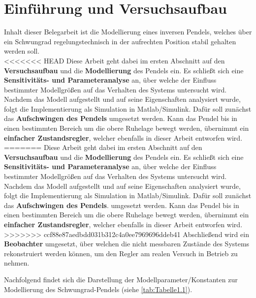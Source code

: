 \pagestyle{aaron}
\section{Einführung und Versuchsaufbau}\label{sec:Einfuehrung}

Inhalt dieser Belegarbeit ist die Modellierung eines inversen Pendels, welches über ein Schwungrad regelungstechnisch in der aufrechten Position stabil gehalten werden soll. \\

<<<<<<< HEAD
Diese Arbeit geht dabei im ersten Abschnitt auf den \textbf{Versuchsaufbau} und die \textbf{Modellierung} des Pendels ein. Es schließt sich eine \textbf{Sensitivitäts- und Parameteranalyse} an, über welche der Einfluss bestimmter Modellgrößen auf das Verhalten des Systems untersucht wird. \\
Nachdem das Modell aufgestellt und auf seine Eigenschaften analysiert wurde, folgt die Implementierung als Simulation in Matlab/Simulink. Dafür soll zunächst das \textbf{Aufschwingen des Pendels} umgesetzt werden. Kann das Pendel bis in einen bestimmten Bereich um die obere Ruhelage bewegt werden, übernimmt ein \textbf{einfacher Zustandsregler}, welcher ebenfalls in dieser Arbeit entworfen wird. \\
=======
Diese Arbeit geht dabei im ersten Abschnitt auf den \textbf{Versuchsaufbau} und die \textbf{Modellierung} des Pendels ein. Es schließt sich eine \\ \textbf{Sensitivitäts- und Parameteranalyse} an, über welche der Einfluss bestimmter Modellgrößen auf das Verhalten des Systems untersucht wird. \\
Nachdem das Modell aufgestellt und auf seine Eigenschaften analysiert wurde, folgt die Implementierung als Simulation in Matlab/Simulink. Dafür soll zunächst das \textbf{Aufschwingen des Pendels}. umgesetzt werden. Kann das Pendel bis in einen bestimmten Bereich um die obere Ruhelage bewegt werden, übernimmt ein \textbf{einfacher Zustandsregler}, welcher ebenfalls in dieser Arbeit entworfen wird. \\
>>>>>>> ccf88e87aedbdd031b312c4a0ee7969696ddeb41
Abschließend wird ein \textbf{Beobachter} umgesetzt, über welchen die nicht messbaren Zustände des Systems rekonstruiert werden können, um den Regler am realen Versuch in Betrieb zu nehmen.

Nachfolgend findet sich die Darstellung der Modellparameter/Konstanten zur Modellierung des Schwungrad-Pendels (siehe \autoref{tab:Tabelle1.1}).

